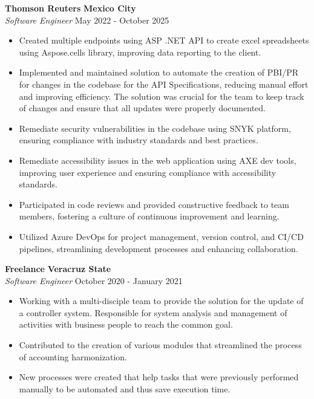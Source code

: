 \documentclass[a4paper]{article}
\begin{document}
\textbf{Thomson Reuters} \hfill \textbf{Mexico City}\\
\textit{Software Engineer} \hfill May 2022 - October 2025\\
\vspace{-1mm}
\begin{itemize} \itemsep 1pt
	\item Created multiple endpoints using ASP .NET API to create excel spreadsheets using Aspose.cells library, improving data reporting to the client.
	\item Implemented and maintained solution to automate the creation of PBI/PR for changes in the codebase for the API Specifications, reducing manual effort and improving efficiency. The solution was crucial for the team to keep track of changes and ensure that all updates were properly documented.
	\item Remediate  security vulnerabilities in the codebase using SNYK platform, ensuring compliance with industry standards and best practices.
	\item Remediate accessibility issues in the web application using AXE dev tools, improving user experience and ensuring compliance with accessibility standards.
    \item Participated in code reviews and provided constructive feedback to team members, fostering a culture of continuous improvement and learning.
    \item Utilized Azure DevOps for project management, version control, and CI/CD pipelines, streamlining development processes and enhancing collaboration.
\end{itemize}

\textbf{Freelance} \hfill \textbf{Veracruz State}\\
\textit{Software Engineer} \hfill October 2020 - January 2021\\
\vspace{-1mm}
\begin{itemize} \itemsep 1pt
	\item  Working with a multi-disciple team to provide the solution for the
 update of a controller system. Responsible for system analysis and
 management of activities with business people to reach the common goal.
    \item Contributed to the creation of various modules that streamlined the process of accounting harmonization.
    \item New processes were created that help tasks that were previously performed manually to be automated and thus save execution time.
\end{itemize}
\end{document}
